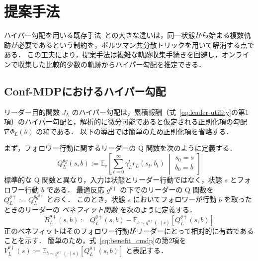 \documentclass[originalpaper,fleqn]{jsaiart}     %
\providecommand{\E}{\mathbb{E}} %
\begin{document}
\section{提案手法}

ハイパー勾配を用いる既存手法~\cite{Thoma2024-em,Yang2025-lr}との大きな違いは，同一状態から始まる複数軌跡が必要であるという制約を，ボルツマン共分散トリックを用いて解消する点である．
この工夫により，提案手法は複雑な軌跡収集手続きを回避し，オンラインで収集した比較的少数の軌跡からハイパー勾配を推定できる．

\subsection{Conf-MDPにおけるハイパー勾配}

リーダー目的関数 $J_L$ のハイパー勾配は，累積報酬（式~\eqref{eq:leader-utility}の第1項）のハイパー勾配と，解析的に微分可能であると仮定される正則化項の勾配 $\nabla \Phi_L({\theta})$ の和である．
以下の導出では簡単のため正則化項を省略する．

まず，フォロワー行動に関するリーダーの Q 関数を次のように定義する．
\begin{equation*}
    Q_L^{{\theta} {g}}(s, b) :=\E_\tau\left[\sum_{t=0}^\infty\gamma_L^t r_L(s_t,b_t)~\middle|\begin{smallmatrix}s_0=s\\b_0=b\end{smallmatrix}\right]
\end{equation*}
標準的な Q 関数と異なり，入力は状態とリーダー行動ではなく，状態 $s$ とフォロワー行動 $b$ である．
最適反応 $g^{\theta\dagger}$ の下でのリーダーの Q 関数を $Q_L^{{\theta} \dagger} := Q_L^{{\theta} {g^{\theta\dagger}}}$ とおく．
このとき，状態 $s$ においてフォロワーが行動 $b$ を取ったときのリーダーの \emph{ベネフィット関数} を次のように定義する．
\begin{equation}
B_L^{{\theta}\dagger}(s, b) := Q_L^{{\theta}\dagger}(s,b)-\E_{b\sim g^{{\theta}\dagger}(\cdot\mid s)}\left[Q_L^{{\theta}\dagger}(s,b)\right]\label{eq:benefit_cmdp}
\end{equation}
正のベネフィットはそのフォロワー行動がリーダーにとって相対的に有益であることを示す．
簡単のため，式~\eqref{eq:benefit_cmdp}の第2項を$V_L^{\theta\dag}(s) := \E_{b\sim g^{{\theta}\dagger}(\cdot\mid s)}\left[Q_L^{{\theta}\dagger}(s,b)\right]$ と表記する．
\end{document}
